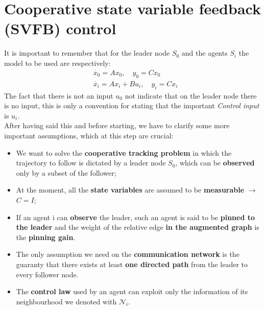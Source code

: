 \section{Cooperative state variable feedback (SVFB) control} 
\noindent
It is important to remember that for the leader node $S_0$ and the agents $S_i$ the model to be used are respectively: 
\begin{align*}
    &\dot{x_0} = A x_0, \quad y_0 = C x_0\\
    &\dot{x_i} = A x_i + B u_i, \quad y_i = C x_i
\end{align*}
The fact that there is not an input $u_0$ not indicate that on the leader node there is no input, this is only a convention for stating that the important \textit{Control input} is $u_i$.\\
After having said this and before starting,  we have to clarify some more important assumptions, which at this step are crucial: 
\begin{itemize}
    \itemsep0em
    \item We want to solve the \textbf{cooperative tracking problem} in which the trajectory to follow is dictated by a leader node $S_0$, which can be \textbf{observed} only by a subset of the follower;
    \item At the moment, all the \textbf{state variables} are assumed to be \textbf{measurable} $\to$ $C=I$; 
    \item If an agent i can \textbf{observe} the leader, such an agent is said to be \textbf{pinned to the leader} and the weight of the relative edge \textbf{in the augmented graph} is the \textbf{pinning gain}.
    \item The only assumption we need on the \textbf{communication network} is the guaranty that there exists at least \textbf{one directed path} from the leader to every follower node.
    \item The \textbf{control law} used by an agent can exploit only the information of its neighbourhood we denoted with $\mathcal{N}_i$.
\end{itemize}


